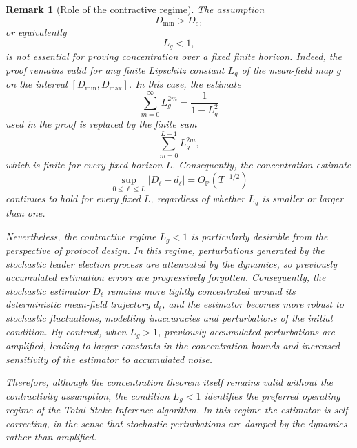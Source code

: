 \documentclass[10pt]{iopart}
\newcommand{\1}{\mathbf{1}}
\newtheorem{remark}{Remark}[section]
\begin{document}
\begin{remark}[Role of the contractive regime]
The assumption
\begin{equation}
D_{\min}>D_c,
\label{eq:remark_contractivity}
\end{equation}
or equivalently
\begin{equation}
L_g<1,
\label{eq:remark_Lg}
\end{equation}
is not essential for proving concentration over a fixed finite horizon. Indeed, the proof remains valid for any finite Lipschitz constant $L_g$ of the mean-field map $g$ on the interval $[D_{\min},D_{\max}]$. In this case, the estimate
\begin{equation}
\sum_{m=0}^{\infty}L_g^{2m}
=
\frac{1}{1-L_g^2}
\label{eq:remark_geometric}
\end{equation}
used in the proof is replaced by the finite sum
\begin{equation}
\sum_{m=0}^{L-1}L_g^{2m},
\label{eq:remark_finite_sum}
\end{equation}
which is finite for every fixed horizon $L$. Consequently, the concentration estimate
\begin{equation}
\sup_{0\le\ell\le L}|D_\ell-d_\ell|
=
O_{\mathbb P}(T^{-1/2})
\label{eq:remark_concentration}
\end{equation}
continues to hold for every fixed $L$, regardless of whether $L_g$ is smaller or larger than one.

Nevertheless, the contractive regime $L_g<1$ is particularly desirable from the perspective of protocol design. In this regime, perturbations generated by the stochastic leader election process are attenuated by the dynamics, so previously accumulated estimation errors are progressively forgotten. Consequently, the stochastic estimator $D_\ell$ remains more tightly concentrated around its deterministic mean-field trajectory $d_\ell$, and the estimator becomes more robust to stochastic fluctuations, modelling inaccuracies and perturbations of the initial condition. By contrast, when $L_g>1$, previously accumulated perturbations are amplified, leading to larger constants in the concentration bounds and increased sensitivity of the estimator to accumulated noise.

Therefore, although the concentration theorem itself remains valid without the contractivity assumption, the condition $L_g<1$ identifies the preferred operating regime of the Total Stake Inference algorithm. In this regime the estimator is self-correcting, in the sense that stochastic perturbations are damped by the dynamics rather than amplified.
\end{remark}
\end{document}
